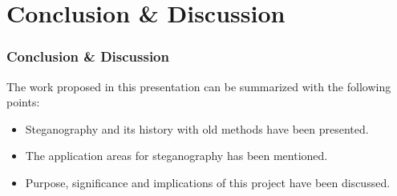\documentclass[12pt,hyperref={unicode}]{beamer}
\begin{document}




\section{Conclusion \& Discussion}
\begin{frame}
\frametitle{Conclusion \& Discussion}


The work proposed in this presentation can be summarized with the following points:\\
\begin{itemize}
\pause
\item Steganography and its history with old methods have been presented. 
\item The application areas for steganography has been mentioned.
\item Purpose, significance and implications of this project have been discussed.

\end{itemize}
\end{frame}
\end{document}

